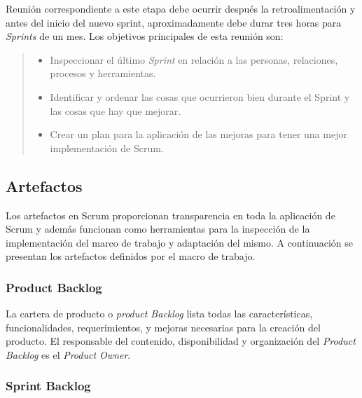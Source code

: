  \noindent Reunión correspondiente a este etapa debe ocurrir después la retroalimentación y antes del inicio del
 nuevo sprint, aproximadamente debe durar tres horas para {\it Sprints} de un mes. Los objetivos principales de
 esta reunión son:

    \begin{quote}
    \begin{itemize}
    \item Inspeccionar el último {\it Sprint} en relación a las personas, relaciones, procesos y herramientas.
    \item Identificar y ordenar las cosas que ocurrieron bien durante el Sprint y las cosas que hay que mejorar.
    \item Crear un plan para la aplicación de las mejoras para tener una mejor implementación de Scrum.
    \end{itemize}
    \end{quote}

\subsection{Artefactos}

 Los artefactos en Scrum proporcionan transparencia en toda la aplicación de Scrum
 y además funcionan como herramientas para la inspección de la implementación del
 marco de trabajo y adaptación del mismo. A continuación se presentan los artefactos
 definidos por el macro de trabajo.

 

\subsubsection{Product Backlog}

 La cartera de producto o {\it product Backlog} lista todas las características, funcionalidades, requerimientos,
 y mejoras necesarias para la creación del producto. El responsable del contenido, disponibilidad y organización
 del {\it Product Backlog} es el {\it Product Owner}.\\

\subsubsection{Sprint Backlog}
    
